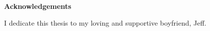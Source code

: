 \noindent
{\LARGE\textbf{Acknowledgements}}
\vspace{1cm}

\begin{spacing}{1} 
\noindent I dedicate this thesis to my loving and supportive boyfriend, Jeff.


\end{spacing}
